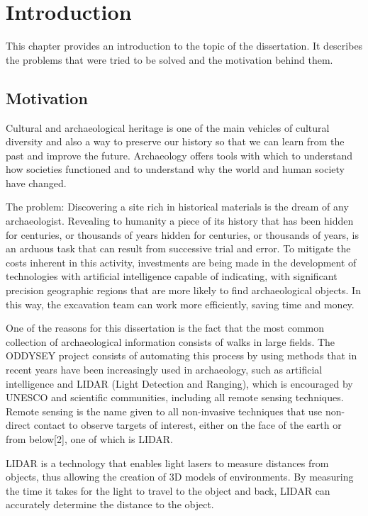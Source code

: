 

\chapter{Introduction}
\label{chapter:introduction}

This chapter provides an introduction to the topic of the dissertation. It describes the problems that were tried to be solved and the motivation behind them.
\section{Motivation}
Cultural and archaeological heritage is one of the main vehicles of cultural diversity and also a way to preserve our history so that we can learn from the past and improve the future. Archaeology offers tools with which to understand how societies functioned and to understand why the world and human society have changed.

The problem: 
Discovering a site rich in historical materials is the dream of any archaeologist. Revealing to humanity a piece of its history that has been hidden for centuries, or thousands of years
hidden for centuries, or thousands of years, is an arduous task that can result from successive trial and error. To mitigate the costs inherent in this activity, investments are being made in the development of technologies with artificial intelligence capable of indicating, with significant precision
geographic regions that are more likely to find archaeological objects. In this way, the excavation team can work more efficiently, saving time and money.

One of the reasons for this dissertation is the fact that the most common collection of archaeological information consists of walks in large fields. The ODDYSEY project consists of automating this process by using methods that in recent years have been increasingly used in archaeology, such as artificial intelligence and LIDAR (Light Detection and Ranging), which is encouraged by UNESCO and scientific communities\cite{asmr}, including all remote sensing techniques.
Remote sensing is the name given to all non-invasive techniques that use non-direct contact to observe targets of interest, either on the face of the earth or from below[2], one of which is LIDAR.

LIDAR is a technology that enables light lasers to measure distances from objects, thus allowing the creation of 3D models of environments. By measuring the time it takes for the light to travel to the object and back, LIDAR can accurately determine the distance to the object.

